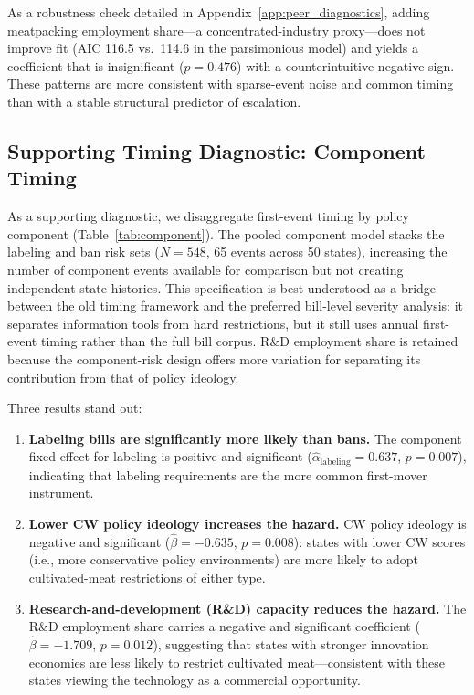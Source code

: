 \documentclass[12pt]{article}
\begin{document}
As a robustness check detailed in Appendix~\ref{app:peer_diagnostics}, adding meatpacking employment share---a concentrated-industry proxy---does not improve fit (AIC 116.5 vs.\ 114.6 in the parsimonious model) and yields a coefficient that is insignificant ($p = 0.476$) with a counterintuitive negative sign.  These patterns are more consistent with sparse-event noise and common timing than with a stable structural predictor of escalation.

\subsection{Supporting Timing Diagnostic: Component Timing}

As a supporting diagnostic, we disaggregate first-event timing by policy component (Table~\ref{tab:component}).  The pooled component model stacks the labeling and ban risk sets ($N = 548$, 65 events across 50 states), increasing the number of component events available for comparison but not creating independent state histories.  This specification is best understood as a bridge between the old timing framework and the preferred bill-level severity analysis: it separates information tools from hard restrictions, but it still uses annual first-event timing rather than the full bill corpus.  R\&D employment share is retained because the component-risk design offers more variation for separating its contribution from that of policy ideology.

Three results stand out:

\begin{enumerate}
    \item \textbf{Labeling bills are significantly more likely than bans.}  The component fixed effect for labeling is positive and significant ($\hat{\alpha}_{\text{labeling}} = 0.637$, $p = 0.007$), indicating that labeling requirements are the more common first-mover instrument.

    \item \textbf{Lower CW policy ideology increases the hazard.}  CW policy ideology is negative and significant ($\hat{\beta} = -0.635$, $p = 0.008$): states with lower CW scores (i.e., more conservative policy environments) are more likely to adopt cultivated-meat restrictions of either type.

    \item \textbf{Research-and-development (R\&D) capacity reduces the hazard.}  The R\&D employment share carries a negative and significant coefficient ($\hat{\beta} = -1.709$, $p = 0.012$), suggesting that states with stronger innovation economies are less likely to restrict cultivated meat---consistent with these states viewing the technology as a commercial opportunity.
\end{enumerate}
\end{document}
